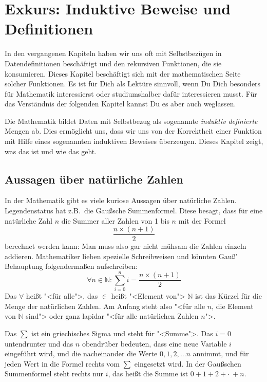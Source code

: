 
\chapter{Exkurs: Induktive Beweise und Definitionen}
\label{cha:indu}

In den vergangenen Kapiteln haben wir uns oft mit Selbstbezügen in
Datendefinitionen beschäftigt und den rekursiven Funktionen, die sie
konsumieren.  Dieses Kapitel beschäftigt sich mit der mathematischen
Seite solcher Funktionen.  Es ist für Dich als Lektüre sinnvoll, wenn
Du Dich besonders für Mathematik interessierst oder studiumshalber
dafür interessieren musst.  Für das Verständnis der folgenden Kapitel
kannst Du es aber auch weglassen.

Die Mathematik bildet Daten mit Selbstbezug als sogenannte
\textit{induktiv definierte} Mengen ab.  Dies ermöglicht uns, dass wir
uns von der Korrektheit einer Funktion mit Hilfe eines sogenannten
induktiven Beweises überzeugen.  Dieses Kapitel zeigt, was das ist und
wie das geht.

\section{Aussagen über natürliche Zahlen}
\label{sec:mathematical-induction}

In der Mathematik gibt es viele kuriose Aussagen über natürliche
Zahlen.  Legendenstatus hat z.B.\ die Gaußsche
Summenformel.  Diese besagt, dass für
eine natürliche Zahl $n$ die Summer aller Zahlen von 1 bis $n$ mit der
Formel
\[\frac{n\times (n+1)}{2}\]
berechnet werden kann: Man muss also gar nicht mühsam die Zahlen
einzeln addieren.  Mathematiker lieben spezielle Schreibweisen und
könnten Gauß' Behauptung folgendermaßen aufschreiben:
%
\[\forall n\in\mathbb{N}: \sum_{i=0}^n i =
  \frac{n\times (n+1)}{2}\]
%
Das $\forall$ heißt "<für alle">, das $\in$ heißt "<Element von">
$\mathbb{N}$ ist das Kürzel für die Menge der natürlichen Zahlen.
Am Anfang steht also "<für alle $n$, die Element von $\mathbb{N}$
sind"> oder ganz lapidar "<für alle natürlichen Zahlen $n$">.

Das $\sum$ ist ein griechisches Sigma und steht für "<Summe">.  Das
$i=0$ untendrunter und das $n$ obendrüber bedeuten, dass eine neue
Variable $i$ eingeführt wird, und die nacheinander die Werte $0, 1, 2,
\ldots n$ annimmt, und für jeden Wert in die Formel rechts vom $\sum$
eingesetzt wird.  In der Gaußschen Summenformel steht rechts nur 
$i$, das heißt die Summe ist $0 + 1 + 2 + \cdot \ + n$.


